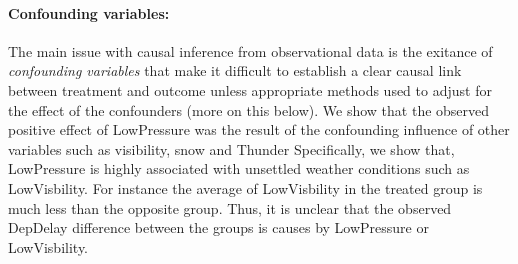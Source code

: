  \paragraph{\bf Confounding variables:} The main issue with causal inference from observational data
 is the exitance of {\em confounding variables} that  make it difficult to establish a clear causal link between treatment and outcome unless appropriate methods used to adjust for the effect of the confounders (more on this below).   We show that the observed positive effect of LowPressure
 was the result of the confounding influence of other variables such as visibility, snow and Thunder
    Specifically, we show that, LowPressure is highly associated with unsettled weather conditions such as LowVisbility. For instance the average of LowVisbility in the treated group is much less than
  the opposite group. Thus, it is unclear that the observed DepDelay difference between the groups is causes by LowPressure or LowVisbility.



